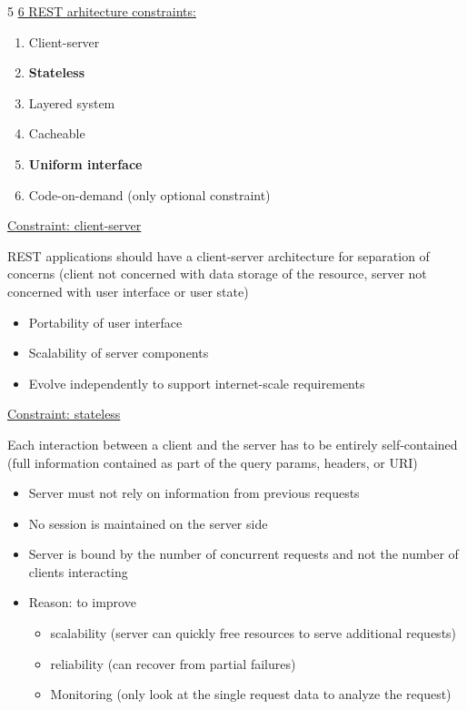 \documentclass[landscape,a4paper]{extarticle}
\begin{document}
\begin{multicols*}{5}
    \uline{6 REST arhitecture constraints:}

    \begin{enumerate}
        \item Client-server
        \item \textbf{Stateless}
        \item Layered system
        \item Cacheable
        \item \textbf{Uniform interface}
        \item Code-on-demand (only optional constraint)
    \end{enumerate}

    \uline{Constraint: client-server}
    
    REST applications should have a client-server architecture for separation
    of concerns (client not concerned with data storage of the resource, server
    not concerned with user interface or user state)
    \begin{itemize}
        \item Portability of user interface
        \item Scalability of server components
        \item Evolve independently to support internet-scale requirements
    \end{itemize}

    \uline{Constraint: stateless}

    Each interaction between a client and the server has to be entirely self-contained
    (full information contained as part of the query params, headers, or URI)
    \begin{itemize}
        \item Server must not rely on information from previous requests
        \item No session is maintained on the server side
        \item Server is bound by the number of concurrent requests and not the
        number of clients interacting
        \item Reason: to improve
        \begin{itemize}
            \item scalability (server can quickly free resources
            to serve additional requests)
            \item reliability (can recover from partial failures)
            \item Monitoring (only look at the single request data to analyze the request)
        \end{itemize}
    \end{itemize}


\end{multicols*}
\end{document}
